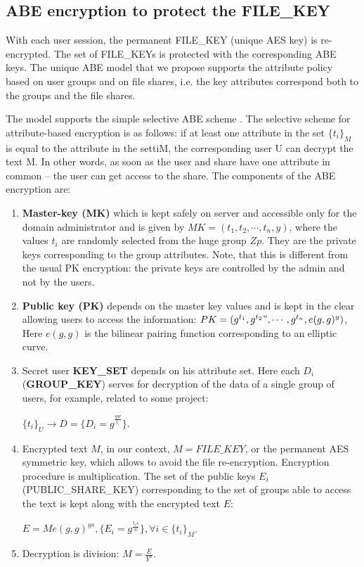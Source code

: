 \documentclass[twocolumn]{svjour3}          	%
\begin{document}
\subsection{ABE encryption to protect the FILE\_KEY }
\label{sec_abe}
With each user session, the permanent FILE\_KEY (uni\-que AES key) is re-encrypted. The set of FILE\_KEYs is protected with the corresponding ABE keys. The unique ABE model that we propose supports the attribute policy based on user groups and on file shares, i.e. the key attributes correspond both to the groups and the file shares. 

The model supports the simple selective ABE scheme \cite{galibus2015cloud,galibus2014}. The selective scheme for attribute-based encryption is as follows: if at least one attribute in the set $\{t_i\}_M$ is equal to the attribute in the set{ti}M, the corresponding user U can decrypt the text M. In other words, as soon as the user and share have one attribute in common – the user can get access to the share. The components of the ABE encryption are:

\begin{enumerate}
	\item \textbf{Master-key (MK)} which is kept safely on server and accessible only for the domain administrator and is given by $MK = (t_1, t_2, \cdots ,t_n, y)$, where the values $t_i$ are randomly selected from the huge group $Zp$. They are the private keys corresponding to the group attributes. Note, that this is different from the usual PK encryption: the private keys are controlled by the admin and not by the users.
	\item \textbf{Public key (PK)} depends on the master key values and is kept in the clear allowing users to access the information: $PK = (g^{t_1}, g^{t_2}", \cdots ,g^{t_n}, e(g,g)^y)$, Here $e(g,g)$ is the bilinear pairing function corresponding to an elliptic curve.
	\item Secret user \textbf{KEY\_SET} depends on his attribute set. Here each $D_i$ (\textbf{GROUP\_KEY}) serves for decryption of the data of a single group of users, for example, related to some project: 
	
	$\{t_i\}_U \rightarrow D = \{D_i = g^{\frac{yw}{t_i}}\}$.
	
	\item Encrypted text $M$, in our context, $M = FILE\_KEY$, or the permanent AES symmetric key, which allows to avoid the file re-encryption. Encryption procedure is multiplication. The set of the public keys $E_i$ (PUBLIC\_SHARE\_KEY) corresponding to the set of groups able to access the text is kept along with the encrypted text $E$: 

	$E=Me(g,g)^{ys}, \{E_i = g^{\frac{t_is}{w}}\}, \forall i \in \{t_i\}_M$.
	
	\item Decryption is division: $M = \frac{E}{Y^s}$. 
\end{enumerate}
\end{document}
